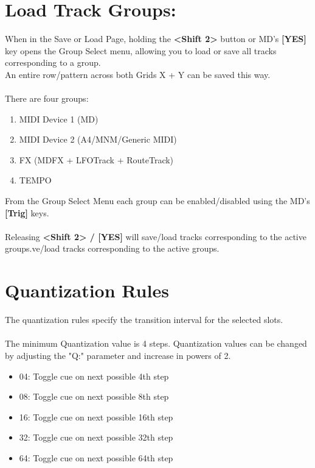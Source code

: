 \section{Load Track Groups:}
When in the Save or Load Page, holding the \textbf{<Shift 2>} button or MD's \textbf{[YES]} key opens the Group Select menu,
allowing you to load or save all tracks corresponding to a group.\\An entire row/pattern across both Grids X + Y can be saved this way.\\
\\
There are four groups:
\begin{enumerate}
    \item MIDI Device 1 (MD)
    \item MIDI Device 2 (A4/MNM/Generic MIDI)
    \item FX (MDFX + LFOTrack + RouteTrack)
    \item TEMPO
\end{enumerate}
From the Group Select Menu each group can be enabled/disabled using the MD's \textbf{[Trig]} keys.\\
\\
Releasing \textbf{<Shift 2> / [YES]} will save/load tracks corresponding to the active groups.ve/load tracks corresponding to the active groups.
\section{Quantization Rules}
The quantization rules specify the transition interval for the selected slots.\\
\\
The minimum Quantization value is 4 steps. Quantization values can be changed by adjusting the "Q:" parameter and increase in powers of 2.\\
\begin{itemize}
\item 04: Toggle cue on next possible 4th step
\item 08: Toggle cue on next possible 8th step 
\item 16: Toggle cue on next possible 16th step 
\item 32: Toggle cue on next possible 32th step 
\item 64: Toggle cue on next possible 64th step
\end{itemize}

